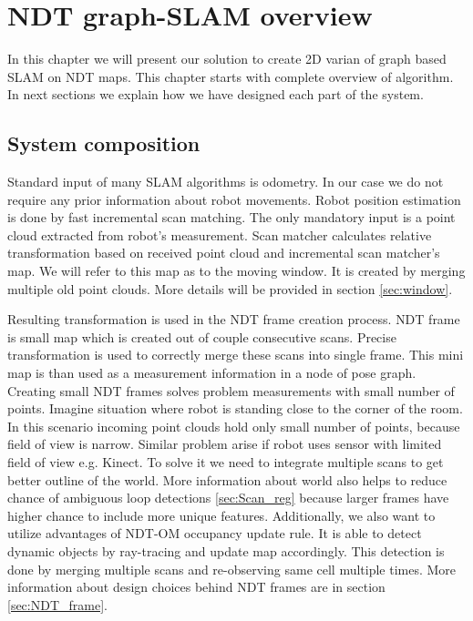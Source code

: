 \chapter{NDT graph-SLAM overview}
In this chapter we will present our solution to create 2D varian of graph based \gls{SLAM} on \gls{NDT} maps. This chapter starts with complete overview of algorithm. In next sections we explain how we have designed each part of the system.
\section{System composition}
\label{sec:Sys_arch}

Standard input of many \gls{SLAM} algorithms is odometry. In our case we do not require any prior information about robot movements. Robot position estimation is done by fast incremental scan matching. The only mandatory input is a point cloud extracted from robot's measurement. Scan matcher calculates relative transformation based on received point cloud and incremental scan matcher's map. We will refer to this map as to the moving window. It is created by merging multiple old point clouds. More details will be provided in section \ref{sec:window}.

Resulting transformation is used in the \gls{NDT} frame creation process. \gls{NDT} frame is small map which is created out of couple consecutive scans. Precise transformation is used to correctly merge these scans into single frame. This mini map is than used as a measurement information in a node of pose graph. Creating small \gls{NDT} frames solves problem measurements with small number of points. Imagine situation where robot is standing close to the corner of the room. In this scenario incoming point clouds hold only small number of points, because field of view is narrow. Similar problem arise if robot uses sensor with limited field of view e.g. Kinect. To solve it we need to integrate multiple scans to get better outline of the world. More information about world also helps to reduce chance of ambiguous loop detections \ref{sec:Scan_reg} because larger frames have higher chance to include more unique features. Additionally, we also want to utilize advantages of \gls{NDT-OM} occupancy update rule. It is able to detect dynamic objects by ray-tracing and update map accordingly. This detection is done by merging multiple scans and re-observing same cell multiple times. More information about design choices behind \gls{NDT} frames are in section \ref{sec:NDT_frame}.

